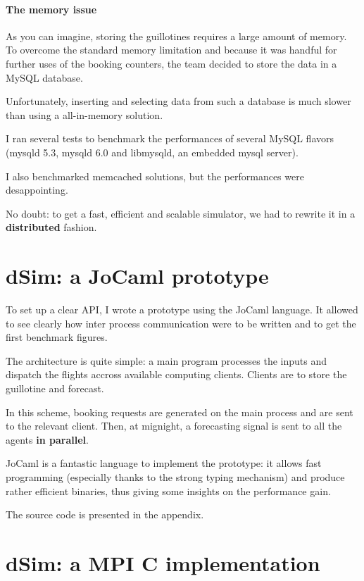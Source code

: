 \documentclass[11pt]{JHEP3}
\begin{document}
\paragraph{The memory issue}

As you can imagine, storing the guillotines requires a large amount of
memory. To overcome the standard memory limitation and because it was
handful for further uses of the booking counters, the team decided to
store the data in a MySQL database.

Unfortunately, inserting and selecting data from such a database is
much slower than using a all-in-memory solution.

I ran several tests to benchmark the performances of several MySQL
flavors (mysqld 5.3, mysqld 6.0 and libmysqld, an embedded mysql
server).

I also benchmarked memcached solutions, but the performances were
desappointing.

No doubt: to get a fast, efficient and scalable simulator, we had to
rewrite it in a \textbf{distributed} fashion.

\section{dSim: a JoCaml prototype}

To set up a clear API, I wrote a prototype using the JoCaml
language. It allowed to see clearly how inter process communication
were to be written and to get the first benchmark figures.

The architecture is quite simple: a main program processes the inputs
and dispatch the flights accross available computing clients. Clients
are to store the guillotine and forecast.

In this scheme, booking requests are generated on the main process and
are sent to the relevant client. Then, at mignight, a forecasting
signal is sent to all the agents \textbf{in parallel}.

JoCaml is a fantastic language to implement the prototype: it allows
fast programming (especially thanks to the strong typing mechanism)
and produce rather efficient binaries, thus giving some insights on
the performance gain.

The source code is presented in the appendix.

\section{dSim: a MPI C implementation}
\end{document}
